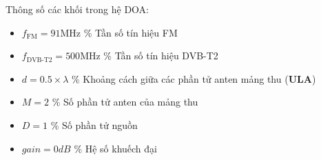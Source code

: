 {Thông số các khối trong hệ DOA:
{\renewcommand\labelitemi{}
\begin{itemize}
	\item $f_{\textrm{FM}} = 91\textrm{MHz}$			\hspace{1.3cm}\% Tần số tín hiệu FM
	\item $f_{\textrm{DVB-T2}} = 500\textrm{MHz}$		\hspace{0.45cm}\% Tần số tín hiệu DVB-T2
	\item $d = 0.5 \times \lambda$		\hspace{1.85cm}\% Khoảng cách giữa các phần tử anten mảng thu (\textbf{ULA})
	\item $M = 2$				\hspace{2.68cm}\% Số phần tử anten của mảng thu
	\item $D = 1$				\hspace{2.77cm}\% Số phần tử nguồn
	\item $gain = 0 dB$			\hspace{1.75cm}\% Hệ số khuếch đại
\end{itemize}
\begin{figure} [!ht]
	\centering

\end{figure}}}
